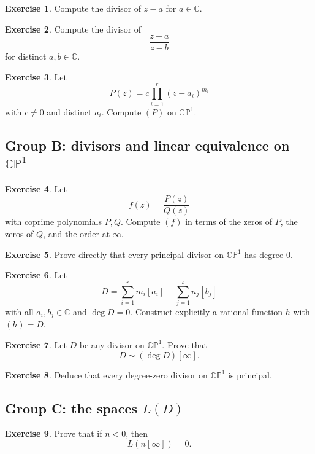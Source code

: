 \documentclass[11pt]{article}
\newcommand{\C}{\mathbb{C}}
\newcommand{\CP}{\mathbb{CP}}
\newcommand{\degd}{\operatorname{deg}}
\newcommand{\CPone}{\CP^1}
\theoremstyle{definition}
\newtheorem{exercise}{Exercise}[section]
\theoremstyle{plain}
\begin{document}
\begin{exercise}
Compute the divisor of $z-a$ for $a\in \C$.
\end{exercise}

\begin{exercise}
Compute the divisor of
\[
\frac{z-a}{z-b}
\]
for distinct $a,b\in \C$.
\end{exercise}

\begin{exercise}
Let
\[
P(z)=c\prod_{i=1}^r (z-a_i)^{m_i}
\]
with $c\neq 0$ and distinct $a_i$. Compute $(P)$ on $\CPone$.
\end{exercise}

\subsection{Group B: divisors and linear equivalence on \texorpdfstring{$\CPone$}{CP1}}
\begin{exercise}
Let
\[
f(z)=\frac{P(z)}{Q(z)}
\]
with coprime polynomials $P,Q$. Compute $(f)$ in terms of the zeros of $P$, the zeros of $Q$, and the order at $\infty$.
\end{exercise}

\begin{exercise}
Prove directly that every principal divisor on $\CPone$ has degree $0$.
\end{exercise}

\begin{exercise}
Let
\[
D=\sum_{i=1}^r m_i[a_i]-\sum_{j=1}^s n_j[b_j]
\]
with all $a_i,b_j\in \C$ and $\degd D=0$. Construct explicitly a rational function $h$ with $(h)=D$.
\end{exercise}

\begin{exercise}
Let $D$ be any divisor on $\CPone$. Prove that
\[
D\sim (\degd D)[\infty].
\]
\end{exercise}

\begin{exercise}
Deduce that every degree-zero divisor on $\CPone$ is principal.
\end{exercise}

\subsection{Group C: the spaces \texorpdfstring{$L(D)$}{L(D)}}
\begin{exercise}
Prove that if $n<0$, then
\[
L(n[\infty])=0.
\]
\end{exercise}
\end{document}
